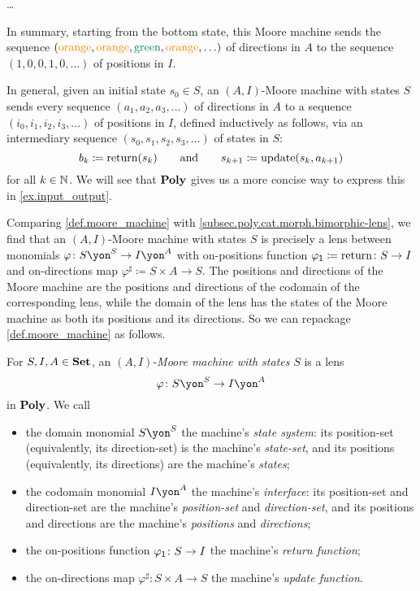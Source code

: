\documentclass[Book-Poly]{subfiles}
\begin{document}
\begin{example}
\begin{enumerate}
    \ldots
\end{enumerate}
In summary, starting from the bottom state, this Moore machine sends the sequence $({\color{orange}\text{orange}}, {\color{orange}\text{orange}}, {\color{dgreen}\text{green}}, {\color{orange}\text{orange}},\ldots)$ of directions in $A$ to the sequence $(1,0,0,1,0,\ldots)$ of positions in $I$.
\end{example}

In general, given an initial state $s_0\in S$, an $(A,I)$-Moore machine with states $S$ sends every sequence $(a_1,a_2,a_3,\ldots)$ of directions in $A$ to a sequence $(i_0,i_1,i_2,i_3,\ldots)$ of positions in $I$, defined inductively as follows, via an intermediary sequence $(s_0,s_1,s_2,s_3,\ldots)$ of states in $S$:
\[
    b_k\coloneqq \text{return}(s_k) \qquad\text{and}\qquad s_{k+1}\coloneqq \text{update}(s_k, a_{k+1})
\]
for all $k\in\mathbb{N}$.
We will see that $\mathbf{Poly}$ gives us a more concise way to express this in \cref{ex.input_output}.

Comparing \cref{def.moore_machine} with \cref{subsec.poly.cat.morph.bimorphic-lens}, we find that an $(A,I)$-Moore machine with states $S$ is precisely a lens between monomials $\varphi\colon S\yon^S\to I\yon^A$ with on-positions function $\varphi_{\textsf{1}}\coloneqq\text{return}\colon S\to I$ and on-directions map $\varphi^\sharp\coloneqq S\times A\to S$.
The positions and directions of the Moore machine are the positions and directions of the codomain of the corresponding lens, while the domain of the lens has the states of the Moore machine as both its positions and its directions.
So we can repackage \cref{def.moore_machine} as follows.

\begin{definition}\label{def.moore_machine2}
  For $S,I,A\in\mathbf{Set}$, an $(A,I)$-\emph{Moore machine with states} $S$ is a lens \[\varphi\colon S\yon^S\to I\yon^A\] in $\mathbf{Poly}$.
  We call
  \begin{itemize}
    \item the domain monomial $S\yon^S$ the machine's \emph{state system}: its position-set (equivalently, its direction-set) is the machine's \emph{state-set}, and its positions (equivalently, its directions) are the machine's \emph{states};
    \item the codomain monomial $I\yon^A$ the machine's \emph{interface}: its position-set and direction-set are the machine's \emph{position-set} and \emph{direction-set}, and its positions and directions are the machine's \emph{positions} and \emph{directions};
    \item the on-positions function $\varphi_{\textsf{1}}\colon S\to I$ the machine's \emph{return function};
    \item the on-directions map $\varphi^\sharp\colon S\times A\to S$ the machine's \emph{update function}.
  \end{itemize}
\end{definition}
\end{document}
